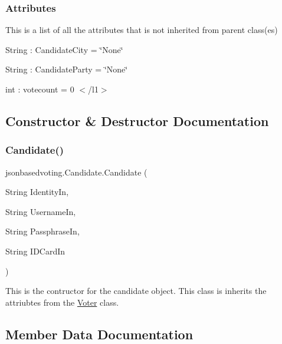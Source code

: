  \subsubsection*{Attributes }

This is a list of all the attributes that is not inherited from parent class(es) 
\begin{DoxyItemize}
\item String \+: Candidate\+City = \char`\"{}\+None\char`\"{} 
\item String \+: Candidate\+Party = \char`\"{}\+None\char`\"{} 
\item int \+: votecount = 0 $<$/l1$>$ 
\end{DoxyItemize}

\subsection{Constructor \& Destructor Documentation}
\mbox{\label{classjsonbasedvoting_1_1_candidate_a688d9c3d940d7858bdffb528bc46b880}} 
\subsubsection{\texorpdfstring{Candidate()}{Candidate()}}
{\footnotesize\ttfamily jsonbasedvoting.\+Candidate.\+Candidate (\begin{DoxyParamCaption}\item[{String}]{Identity\+In,  }\item[{String}]{Username\+In,  }\item[{String}]{Passphrase\+In,  }\item[{String}]{I\+D\+Card\+In }\end{DoxyParamCaption})}

This is the contructor for the candidate object. This class is inherits the attriubtes from the \mbox{\hyperlink{classjsonbasedvoting_1_1_voter}{Voter}} class. 

\subsection{Member Data Documentation}
\mbox{\label{classjsonbasedvoting_1_1_candidate_a6d95daa929e46d70e7ce9fd1efd45eb0}} 
